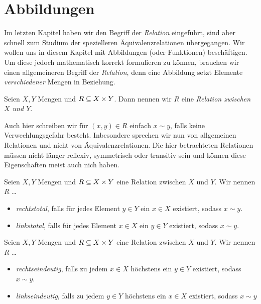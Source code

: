 \section{Abbildungen}

Im letzten Kapitel haben wir den Begriff der \emph{Relation} eingeführt,
sind aber schnell zum Studium der spezielleren Äquivalenzrelationen
übergegangen. Wir wollen uns in diesem Kapitel mit Abbildungen (oder
Funktionen) beschäftigen. Um diese jedoch mathematisch korrekt formulieren
zu können, brauchen wir einen allgemeineren Begriff der \emph{Relation},
denn eine Abbildung setzt Elemente \emph{verschiedener} Mengen in
Beziehung.

\begin{defin}
  
  Seien $X,Y$ Mengen und $R \subseteq X\times Y$. Dann nennen wir $R$ eine
  \emph{Relation zwischen $X$ und $Y$}.

\end{defin}

Auch hier schreiben wir für $(x,y) \in R$ einfach $x \sim y$, falls keine
Verwechlungsgefahr besteht. Inbesondere sprechen wir nun von allgemeinen
Relationen und nicht von Äquivalenzrelationen. Die hier betrachteten
Relationen müssen nicht länger reflexiv, symmetrisch oder transitiv sein
und können diese Eigenschaften meist auch nich haben.


\begin{defin}
  
  Seien $X,Y$ Mengen und $R \subseteq X\times Y$ eine Relation zwischen $X$ und
  $Y$. Wir nennen $R$ …
  \begin{itemize}
    \item \emph{rechtstotal}, falls für jedes Element $y\in Y$ ein
      $x\in X$ existiert, sodass $x \sim y$.
    \item \emph{linkstotal}, falls für jedes Element $x\in X$ ein
      $y\in Y$ existiert, sodass $x \sim y$.
  \end{itemize}
  
\end{defin}


\begin{defin}
  
  Seien $X,Y$ Mengen und $R \subseteq X\times Y$ eine Relation zwischen $X$ und
  $Y$. Wir nennen $R$ …
  \begin{itemize}
    \item \emph{rechtseindeutig}, falls zu jedem $x\in X$ höchstens ein $y\in
      Y$ existiert, sodass $x\sim y$.
    \item \emph{linkseindeutig}, falls zu jedem $y\in Y$ höchstens ein
      $x\in X$ existiert, sodass $x\sim y$
  \end{itemize}
  
\end{defin}

